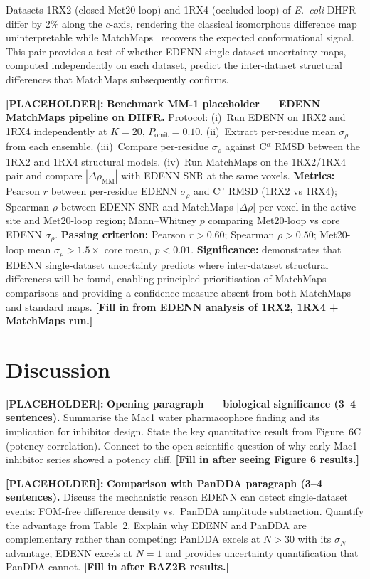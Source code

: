 \documentclass[10pt,twocolumn]{article}
\newcommand{\placeholder}[1]{%
  \begin{mdframed}[
    linecolor=placeholder,linewidth=1pt,
    backgroundcolor=red!5,
    innertopmargin=6pt,innerbottommargin=6pt,
    innerleftmargin=8pt,innerrightmargin=8pt]
  \small\color{placeholder}\textbf{[PLACEHOLDER]:} #1
  \end{mdframed}
}
\begin{document}
Datasets 1RX2 (closed Met20 loop) and 1RX4 (occluded loop) of
\textit{E.~coli} DHFR differ by 2\% along the $c$-axis, rendering
the classical isomorphous difference map uninterpretable while
MatchMaps~\cite{brookner2023} recovers the expected conformational
signal.
This pair provides a test of whether EDENN single-dataset uncertainty
maps, computed independently on each dataset, predict the
inter-dataset structural differences that MatchMaps subsequently
confirms.

\placeholder{
\textbf{Benchmark MM-1 placeholder --- EDENN--MatchMaps pipeline
on DHFR.}
Protocol: (i)~Run EDENN on 1RX2 and 1RX4 independently at
$K=20$, $P_\mathrm{omit}=0.10$.
(ii)~Extract per-residue mean $\sigma_\rho$ from each ensemble.
(iii)~Compare per-residue $\sigma_\rho$ against C$^\alpha$ RMSD
between the 1RX2 and 1RX4 structural models.
(iv)~Run MatchMaps on the 1RX2/1RX4 pair and compare
$|\Delta\rho_\mathrm{MM}|$ with EDENN SNR at the same voxels.
\textbf{Metrics:}
Pearson $r$ between per-residue EDENN $\sigma_\rho$ and
C$^\alpha$ RMSD (1RX2 vs 1RX4);
Spearman $\rho$ between EDENN SNR and MatchMaps $|\Delta\rho|$
per voxel in the active-site and Met20-loop region;
Mann--Whitney $p$ comparing Met20-loop vs core EDENN $\sigma_\rho$.
\textbf{Passing criterion:}
Pearson $r > 0.60$; Spearman $\rho > 0.50$;
Met20-loop mean $\sigma_\rho >1.5\times$ core mean,
$p < 0.01$.
\textbf{Significance:} demonstrates that EDENN single-dataset
uncertainty predicts where inter-dataset structural differences will
be found, enabling principled prioritisation of MatchMaps comparisons
and providing a confidence measure absent from both MatchMaps and
standard maps.
\textbf{[Fill in from EDENN analysis of 1RX2, 1RX4 + MatchMaps run.]}
}

\section{Discussion}

\placeholder{
\textbf{Opening paragraph --- biological significance (3--4 sentences).}
Summarise the Mac1 water pharmacophore finding and its implication
for inhibitor design.
State the key quantitative result from Figure~6C (potency
correlation).
Connect to the open scientific question of why early Mac1 inhibitor
series showed a potency cliff.
\textbf{[Fill in after seeing Figure 6 results.]}
}

\placeholder{
\textbf{Comparison with PanDDA paragraph (3--4 sentences).}
Discuss the mechanistic reason EDENN can detect single-dataset
events: FOM-free difference density vs.\ PanDDA amplitude subtraction.
Quantify the advantage from Table~2.
Explain why EDENN and PanDDA are complementary rather than
competing: PanDDA excels at $N > 30$ with its $\sigma_N$ advantage;
EDENN excels at $N=1$ and provides uncertainty quantification
that PanDDA cannot.
\textbf{[Fill in after BAZ2B results.]}
}
\end{document}

